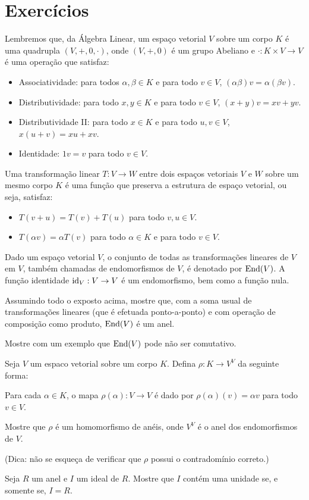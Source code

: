 \section{Exercícios}
\begin{exer}
Lembremos que, da Álgebra Linear, um espaço vetorial $V$ sobre um corpo $K$ é uma quadrupla $(V, +, 0, \cdot)$, onde $(V, +, 0)$ é um grupo Abeliano e $\cdot:K\times V\rightarrow V$ é uma operação que satisfaz:

\begin{itemize}
    \item Associatividade: para todos $\alpha, \beta \in K$ e para todo $v \in V$, $(\alpha\beta)v=\alpha(\beta v)$.
    \item Distributividade: para todo $x, y \in K$ e para todo $v \in V$, $(x+y)v=xv+yv$.
    \item Distributividade II: para todo $x \in K$ e para todo $u, v \in V$, $x(u+v)=xu+xv$.
    \item Identidade: $1v=v$ para todo $v \in V$.
\end{itemize}

Uma transformação linear $T:V\rightarrow W$ entre dois espaços vetoriais $V$ e $W$ sobre um mesmo corpo $K$ é uma função que preserva a estrutura de espaço vetorial, ou seja, satisfaz:

\begin{itemize}
    \item $T(v+u)=T(v)+T(u)$ para todo $v, u \in V$.
    \item $T(\alpha v)=\alpha T(v)$ para todo $\alpha \in K$ e para todo $v \in V$.
\end{itemize}

Dado um espaço vetorial $V$, o conjunto de todas as transformações lineares de $V$ em $V$, também chamadas de endomorfismos de $V$, é denotado por $\operatorname{End}(V)$.
A função identidade $\operatorname{id}_V:V\rightarrow V$ é um endomorfismo, bem como a função nula.

Assumindo todo o exposto acima, mostre que, com a soma usual de transformações lineares (que é efetuada ponto-a-ponto) e com operação de composição como produto, $\operatorname{End}(V)$ é um anel.

Mostre com um exemplo que $\operatorname{End}(V)$ pode não ser comutativo.
\end{exer}

\begin{exer}
Seja $V$ um espaco vetorial sobre um corpo $K$.
Defina $\rho:K\rightarrow V^V$ da seguinte forma: 

Para cada $\alpha \in K$, o mapa $\rho(\alpha):V\rightarrow V$ é dado por $\rho(\alpha)(v)=\alpha v$ para todo $v \in V$.

Mostre que $\rho$ é um homomorfismo de anéis, onde $V^V$ é o anel dos endomorfismos de $V$.

(Dica: não se esqueça de verificar que $\rho$ possui o contradomínio correto.)
\end{exer}

\begin{exer}
    Seja $R$ um anel e $I$ um ideal de $R$.
    Mostre que $I$ contém uma unidade se, e somente se, $I=R$.
\end{exer}